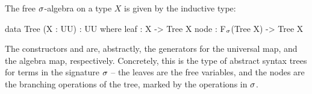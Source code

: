 \begin{definition}
    \label{algebra:tree}
    \label{def:free-algebra-construction}
    The free $\sigma$-algebra on a type $X$ is given by the inductive type:
    \begin{code}
data Tree (X : UU) : UU where
  leaf : X -> Tree X
  node : F$_\sigma$(Tree X) -> Tree X
    \end{code}
\end{definition}
\vspace*{-1.5em}
The constructors  and  are, abstractly,
the generators for the universal map, and the algebra map, respectively.
%
Concretely, this is the type of abstract syntax trees for terms in the signature $\sigma$
-- the leaves are the free variables, and the nodes are the branching operations of the tree,
marked by the operations in $\sigma$.


